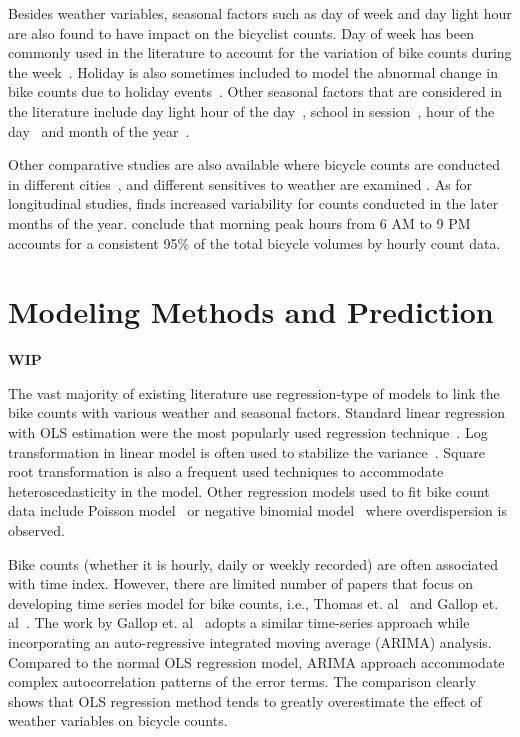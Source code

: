 \documentclass [11pt, proquest] {uwthesis}[2015/03/03]
\begin{document}
Besides weather variables, seasonal factors such as day of week and day light hour are also found to have impact on the bicyclist counts. Day of week has been commonly used in the literature to account for the variation of bike counts during the week~\cite{Ahmed12,PeterWeiran16,Miranda-Moreno:2011aa}. Holiday is also sometimes included to model the abnormal change in bike counts due to holiday events~\cite{Rose07}. Other seasonal factors that are considered in the literature include day light hour of the day~\cite{Ahmed12}, school in session~\cite{PeterWeiran16}, hour of the day~\cite{Miranda-Moreno:2011aa} and month of the year~\cite{Tin:2012aa}.

Other comparative studies are also available where bicycle counts are conducted in different cities~\cite{Nosal:2014aa}, and different sensitives to weather are examined \cite{Rose:2011aa}. As for longitudinal studies, \cite{Niemeier:1996aa} finds increased variability for counts conducted in the later months of the year. \cite{Jones:2010aa} conclude that morning peak hours from 6 AM to 9 PM accounts for a consistent 95\% of the total bicycle volumes by hourly count data. 

\section{Modeling Methods and Prediction}
\textbf{WIP}

The vast majority of existing literature use regression-type of models to link the bike counts with various weather and seasonal factors. Standard linear regression with OLS estimation were the most popularly used regression technique~\cite{Jones:2008aa,Jones:2010aa}. Log transformation in linear model is often used to stabilize the variance~\cite{}. Square root transformation is also a frequent used techniques to accommodate heteroscedasticity in the model. Other regression models used to fit bike count data include Poisson model~\cite{Niemeier:1996aa,Miranda-Moreno:2011aa} or negative binomial model~\cite{PeterWeiran16} where overdispersion is observed.  

Bike counts (whether it is hourly, daily or weekly recorded) are often associated with time index. However, there are limited number of papers that focus on developing time series model for bike counts, i.e., Thomas et. al~\cite{Thomas:2009aa} and Gallop et. al~\cite{Gallop:2012aa}. The work by Gallop et. al~\cite{Gallop:2012aa} adopts a similar time-series approach while incorporating an auto-regressive integrated moving average (ARIMA) analysis. Compared to the normal OLS regression model, ARIMA approach accommodate  complex autocorrelation patterns of the error terms. The comparison clearly shows that OLS regression method tends to greatly overestimate the effect of weather variables on bicycle counts. 
\end{document}
